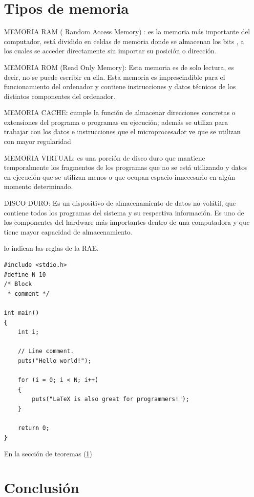 \documentclass{article}
\begin{document}
\section{Tipos de memoria } \label{contenido}
MEMORIA RAM ( Random Access Memory) : es la memoria más importante del computador, está dividido en celdas de memoria donde se almacenan los bits , a los cuales  se acceder directamente sin importar su posición o dirección.
	
\vspace{0.5cm}
MEMORIA ROM (Read Only Memory): Esta memoria es de solo lectura, es decir, no se puede escribir en ella. Esta memoria es imprescindible para el funcionamiento del ordenador y contiene instrucciones y datos técnicos de los distintos componentes del ordenador.
    
\vspace{0.5cm}

MEMORIA CACHE: cumple la función de almacenar direcciones concretas o extensiones del programa o programas en ejecución; además se utiliza para trabajar con los datos e instrucciones que el microprocesador ve que se utilizan con mayor regularidad

\vspace{0.5cm}

MEMORIA VIRTUAL: es una porción de disco duro que mantiene temporalmente los fragmentos de los programas que no se está utilizando y datos en ejecución que se utilizan menos o que ocupan espacio innecesario en algún momento determinado.

\vspace{0.5cm}

DISCO DURO: Es un dispositivo de almacenamiento de datos no volátil, que contiene todos los programas del sistema y su respectiva información. Es uno de los componentes del hardware más importantes dentro de una computadora y que tiene mayor capacidad de almacenamiento.

\vspace{0.5cm}

lo indican las reglas de la RAE. \cite{dirac}

\begin{lstlisting}
#include <stdio.h>
#define N 10
/* Block
 * comment */

int main()
{
    int i;

    // Line comment.
    puts("Hello world!");
    
    for (i = 0; i < N; i++)
    {
        puts("LaTeX is also great for programmers!");
    }

    return 0;
}
\end{lstlisting}


En la sección de teoremas (\ref{contenido})

\section{Conclusión} \label{conclulsion}



\end{document}
